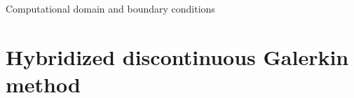 \documentclass[24pt,t,table, aspectratio=169]{beamer}
\newcommand{\vecu}{\mathbf{u}}
\newcommand{\vecn}{\mathbf{n}}
\begin{document}
\begin{frame}{Computational domain and boundary conditions}
\end{frame}

\section{Hybridized discontinuous Galerkin method}
\end{document}
